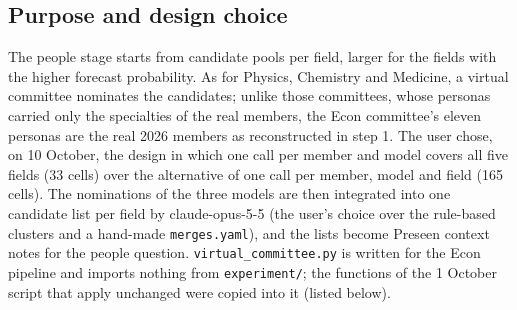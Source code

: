 \documentclass[11pt,a4paper]{article}
\newcommand{\code}[1]{\texttt{#1}}
\begin{document}
\subsection{Purpose and design choice}

The people stage starts from candidate pools per field, larger for the fields with the higher forecast probability. As
for Physics, Chemistry and Medicine, a virtual committee nominates the candidates; unlike those committees, whose
personas carried only the specialties of the real members, the Econ committee's eleven personas are the real 2026
members as reconstructed in step 1. The user chose, on 10 October, the design in which one call per member and model
covers all five fields (33 cells) over the alternative of one call per member, model and field (165 cells). The
nominations of the three models are then integrated into one candidate list per field by claude-opus-5-5 (the user's
choice over the rule-based clusters and a hand-made \code{merges.yaml}), and the lists become Preseen context notes for
the people question.
\code{virtual\_committee.py} is written for the Econ pipeline and imports nothing from \code{experiment/}; the
functions of the 1 October script that apply unchanged were copied into it (listed below).
\end{document}
